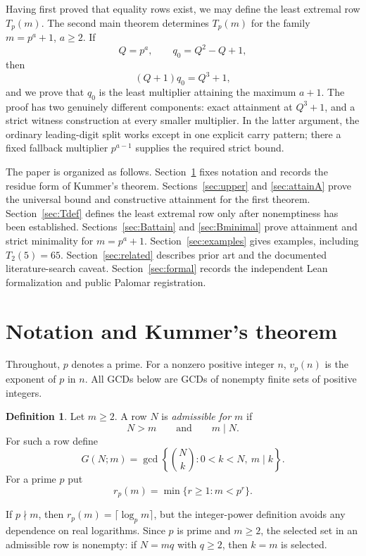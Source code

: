 \documentclass[11pt]{article}
\theoremstyle{definition}
\newtheorem{definition}[theorem]{Definition}
\theoremstyle{remark}
\begin{document}
Having first proved that equality rows exist, we may define the least extremal row $T_p(m)$. The second main theorem determines $T_p(m)$ for the family $m=p^a+1$, $a\ge2$. If
\[
  Q=p^a,\qquad q_0=Q^2-Q+1,
\]
then
\[
  (Q+1)q_0=Q^3+1,
\]
and we prove that $q_0$ is the least multiplier attaining the maximum $a+1$. The proof has two genuinely different components: exact attainment at $Q^3+1$, and a strict witness construction at every smaller multiplier. In the latter argument, the ordinary leading-digit split works except in one explicit carry pattern; there a fixed fallback multiplier $p^{a-1}$ supplies the required strict bound.

The paper is organized as follows. Section~\ref{sec:setup} fixes notation and records the residue form of Kummer's theorem. Sections~\ref{sec:upper} and \ref{sec:attainA} prove the universal bound and constructive attainment for the first theorem. Section~\ref{sec:Tdef} defines the least extremal row only after nonemptiness has been established. Sections~\ref{sec:Battain} and \ref{sec:Bminimal} prove attainment and strict minimality for $m=p^a+1$. Section~\ref{sec:examples} gives examples, including $T_2(5)=65$. Section~\ref{sec:related} describes prior art and the documented literature-search caveat. Section~\ref{sec:formal} records the independent Lean formalization and public Palomar registration.

\section{Notation and Kummer's theorem}\label{sec:setup}

Throughout, $p$ denotes a prime. For a nonzero positive integer $n$, $v_p(n)$ is the exponent of $p$ in $n$. All GCDs below are GCDs of nonempty finite sets of positive integers.

\begin{definition}
Let $m\ge2$. A row $N$ is \emph{admissible for $m$} if
\[
  N>m\qquad\text{and}\qquad m\mid N.
\]
For such a row define
\[
  G(N;m)=\gcd\left\{\binom Nk:0<k<N,\ m\mid k\right\}.
\]
For a prime $p$ put
\[
  r_p(m)=\min\{r\ge1:m<p^r\}.
\]
\end{definition}

If $p\nmid m$, then $r_p(m)=\lceil\log_p m\rceil$, but the integer-power definition avoids any dependence on real logarithms. Since $p$ is prime and $m\ge2$, the selected set in an admissible row is nonempty: if $N=mq$ with $q\ge2$, then $k=m$ is selected.
\end{document}
